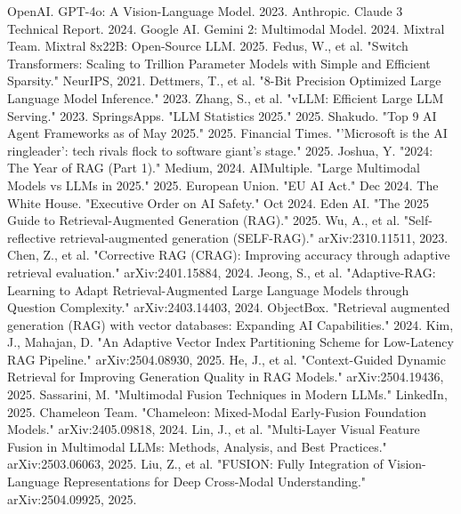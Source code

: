 \documentclass{article}
\begin{document}
\begin{thebibliography}{99}
OpenAI. GPT-4o: A Vision-Language Model. 2023.
Anthropic. Claude 3 Technical Report. 2024.
Google AI. Gemini 2: Multimodal Model. 2024.
Mixtral Team. Mixtral 8x22B: Open-Source LLM. 2025.
Fedus, W., et al. "Switch Transformers: Scaling to Trillion Parameter Models with Simple and Efficient Sparsity." NeurIPS, 2021.
Dettmers, T., et al. "8-Bit Precision Optimized Large Language Model Inference." 2023.
Zhang, S., et al. "vLLM: Efficient Large LLM Serving." 2023.
SpringsApps. "LLM Statistics 2025." 2025.
Shakudo. "Top 9 AI Agent Frameworks as of May 2025." 2025.
Financial Times. "'Microsoft is the AI ringleader': tech rivals flock to software giant's stage." 2025.
Joshua, Y. "2024: The Year of RAG (Part 1)." Medium, 2024.
AIMultiple. "Large Multimodal Models vs LLMs in 2025." 2025.
European Union. "EU AI Act." Dec 2024.
The White House. "Executive Order on AI Safety." Oct 2024.
Eden AI. "The 2025 Guide to Retrieval-Augmented Generation (RAG)." 2025.
Wu, A., et al. "Self-reflective retrieval-augmented generation (SELF-RAG)." arXiv:2310.11511, 2023.
Chen, Z., et al. "Corrective RAG (CRAG): Improving accuracy through adaptive retrieval evaluation." arXiv:2401.15884, 2024.
Jeong, S., et al. "Adaptive-RAG: Learning to Adapt Retrieval-Augmented Large Language Models through Question Complexity." arXiv:2403.14403, 2024.
ObjectBox. "Retrieval augmented generation (RAG) with vector databases: Expanding AI Capabilities." 2024.
Kim, J., Mahajan, D. "An Adaptive Vector Index Partitioning Scheme for Low-Latency RAG Pipeline." arXiv:2504.08930, 2025.
He, J., et al. "Context-Guided Dynamic Retrieval for Improving Generation Quality in RAG Models." arXiv:2504.19436, 2025.
Sassarini, M. "Multimodal Fusion Techniques in Modern LLMs." LinkedIn, 2025.
Chameleon Team. "Chameleon: Mixed-Modal Early-Fusion Foundation Models." arXiv:2405.09818, 2024.
Lin, J., et al. "Multi-Layer Visual Feature Fusion in Multimodal LLMs: Methods, Analysis, and Best Practices." arXiv:2503.06063, 2025.
Liu, Z., et al. "FUSION: Fully Integration of Vision-Language Representations for Deep Cross-Modal Understanding." arXiv:2504.09925, 2025.

\end{thebibliography}
\end{document}
